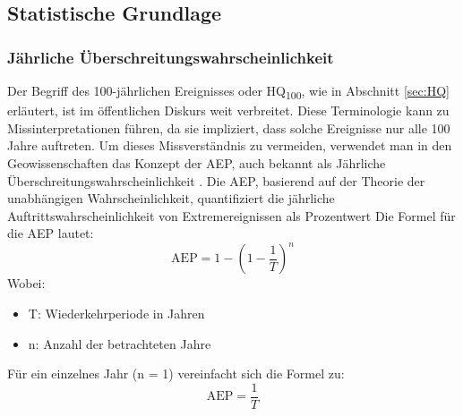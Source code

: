 \subsection{Statistische Grundlage}
\subsubsection{Jährliche Überschreitungswahrscheinlichkeit}\label{sec:AEP}
Der Begriff des 100-jährlichen Ereignisses oder HQ\textsubscript{100}, wie in Abschnitt \ref{sec:HQ} erläutert, ist im öffentlichen Diskurs weit verbreitet. Diese Terminologie kann zu Missinterpretationen führen, da sie impliziert, dass solche Ereignisse nur alle 100 Jahre auftreten. Um dieses Missverständnis zu vermeiden, verwendet man in den Geowissenschaften das Konzept der \ac{AEP}, auch bekannt als Jährliche Überschreitungswahrscheinlichkeit \parencite{uswrc1981} .
Die \ac{AEP}, basierend auf der Theorie der unabhängigen Wahrscheinlichkeit, quantifiziert die jährliche Auftrittswahrscheinlichkeit von Extremereignissen als Prozentwert
Die Formel für die AEP lautet:
\begin{equation}
    \text{AEP} = 1 - \left(1 - \frac{1}{T}\right)^n
    \end{equation}
Wobei:
\begin{itemize}
\item T: Wiederkehrperiode in Jahren
\item n: Anzahl der betrachteten Jahre
\end{itemize}
Für ein einzelnes Jahr (n = 1) vereinfacht sich die Formel zu:
\begin{equation}
\text{AEP} = \frac{1}{T}
\end{equation}

